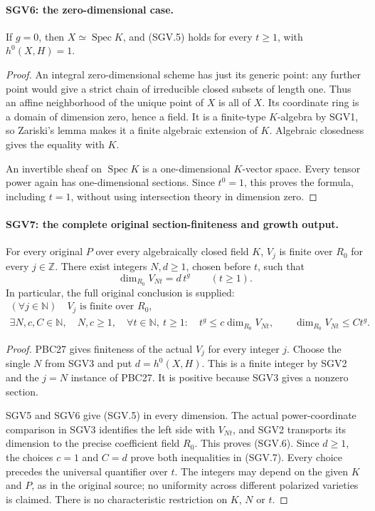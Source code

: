 \paragraph{SGV6: the zero-dimensional case.}
\label{claim:SGV6}
If $g=0$, then $X\simeq\operatorname{Spec}K$, and (SGV.5) holds
for every $t\ge1$, with $h^0(X,H)=1$.

\begin{proof}
An integral zero-dimensional scheme has just its generic point:
any further point would give a strict chain of irreducible closed
subsets of length one.  Thus an affine neighborhood of the unique
point of $X$ is all of $X$.  Its coordinate ring is a domain of
dimension zero, hence a field.  It is a finite-type $K$-algebra by
SGV1, so Zariski's lemma makes it a finite algebraic extension of $K$.
Algebraic closedness gives the equality with $K$.

An invertible sheaf on $\operatorname{Spec}K$ is a one-dimensional
$K$-vector space.  Every tensor power again has one-dimensional
sections.  Since $t^0=1$, this proves the formula, including $t=1$,
without using intersection theory in dimension zero.
\end{proof}

\paragraph{SGV7: the complete original section-finiteness and growth output.}
\label{claim:SGV7}
For every original $P$ over every algebraically closed field $K$,
$V_j$ is finite over $R_0$ for every $j\in\mathbb Z$.
There exist integers $N,d\ge1$, chosen before $t$, such that
\[
 \dim_{R_0}V_{Nt}=d\,t^g\qquad(t\ge1).
                                                        \tag{SGV.6}
\]
In particular, the full original conclusion is supplied:
\[
 \begin{gathered}
  (\forall j\in\mathbb N)\quad V_j\text{ is finite over }R_0,\\
  \exists N,c,C\in\mathbb N,\quad N,c\ge1,\quad
  \forall t\in\mathbb N,\ t\ge1:\quad
  t^g\le c\dim_{R_0}V_{Nt},\qquad
  \dim_{R_0}V_{Nt}\le C t^g.
 \end{gathered}
                                                        \tag{SGV.7}
\]

\begin{proof}
PBC27 gives finiteness of the actual $V_j$ for every integer $j$.
Choose the single $N$ from SGV3 and put $d=h^0(X,H)$.
This is a finite integer by SGV2 and the $j=N$ instance of PBC27.
It is positive because SGV3 gives a nonzero section.

SGV5 and SGV6 give (SGV.5) in every dimension.  The actual
power-coordinate comparison in SGV3 identifies the left side with
$V_{Nt}$, and SGV2 transports its dimension to the precise coefficient
field $R_0$.  This proves (SGV.6).  Since $d\ge1$, the choices
$c=1$ and $C=d$ prove both inequalities in (SGV.7).
Every choice precedes the universal quantifier over $t$.
The integers may depend on the given $K$ and $P$, as in the original
source; no uniformity across different polarized varieties is claimed.
There is no characteristic restriction on $K$, $N$ or $t$.
\end{proof}

